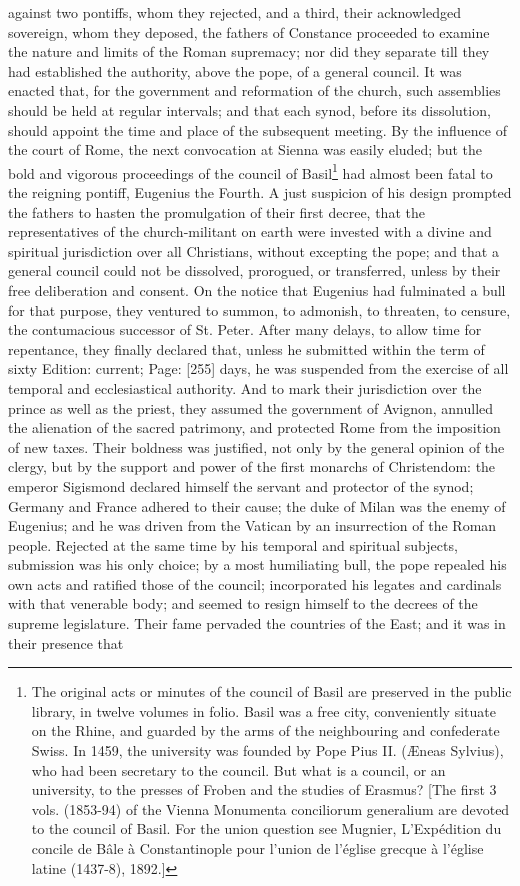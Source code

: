 against two pontiffs, whom they rejected, and a third, their acknowledged sovereign, whom they deposed, the fathers of Constance proceeded to examine the nature and limits of the Roman supremacy; nor did they separate till they had established the authority, above the pope, of a general council. It was enacted that, for the government and reformation of the church, such assemblies should be held at regular intervals; and that each synod, before its dissolution, should appoint the time and place of the subsequent meeting. By the influence of the court of Rome, the next convocation at Sienna was easily eluded; but the bold and vigorous proceedings of the council of Basil\footnote{The original acts or minutes of the council of Basil are preserved in the public library, in twelve volumes in folio. Basil was a free city, conveniently situate on the Rhine, and guarded by the arms of the neighbouring and confederate Swiss. In 1459, the university was founded by Pope Pius II. (Æneas Sylvius), who had been secretary to the council. But what is a council, or an university, to the presses of Froben and the studies of Erasmus? [The first 3 vols. (1853-94) of the Vienna Monumenta conciliorum generalium are devoted to the council of Basil. For the union question see Mugnier, L\texthebrew{}’Expédition du concile de Bâle à Constantinople pour l\texthebrew{}’union de l\texthebrew{}’église grecque à l\texthebrew{}’église latine (1437-8), 1892.]} had almost been fatal to the reigning pontiff, Eugenius the Fourth. A just suspicion of his design prompted the fathers to hasten the promulgation of their first decree, that the representatives of the church-militant on earth were invested with a divine and spiritual jurisdiction over all Christians, without excepting the pope; and that a general council could not be dissolved, prorogued, or transferred, unless by their free deliberation and consent. On the notice that Eugenius had fulminated a bull for that purpose, they ventured to summon, to admonish, to threaten, to censure, the contumacious successor of St. Peter. After many delays, to allow time for repentance, they finally declared that, unless he submitted within the term of sixty Edition: current; Page: [255] days, he was suspended from the exercise of all temporal and ecclesiastical authority. And to mark their jurisdiction over the prince as well as the priest, they assumed the government of Avignon, annulled the alienation of the sacred patrimony, and protected Rome from the imposition of new taxes. Their boldness was justified, not only by the general opinion of the clergy, but by the support and power of the first monarchs of Christendom: the emperor Sigismond declared himself the servant and protector of the synod; Germany and France adhered to their cause; the duke of Milan was the enemy of Eugenius; and he was driven from the Vatican by an insurrection of the Roman people. Rejected at the same time by his temporal and spiritual subjects, submission was his only choice; by a most humiliating bull, the pope repealed his own acts and ratified those of the council; incorporated his legates and cardinals with that venerable body; and seemed to resign himself to the decrees of the supreme legislature. Their fame pervaded the countries of the East; and it was in their presence that 